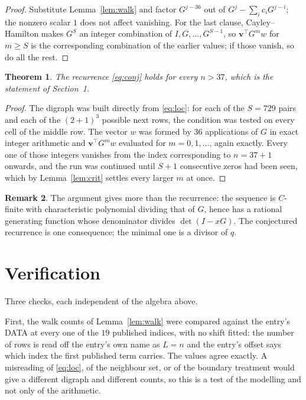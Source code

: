 \documentclass[11pt,a4paper]{article}
\theoremstyle{plain}
\newtheorem{theorem}{Theorem}
\theoremstyle{definition}
\newtheorem{remark}[theorem]{Remark}
\begin{document}
\begin{proof}
Substitute Lemma~\ref{lem:walk} and factor $G^{j-36}$ out of
$G^{j}-\sum_ic_iG^{j-i}$; the nonzero scalar $1$ does not affect
vanishing. For the last clause, Cayley--Hamilton makes $G^{S}$ an integer combination of
$I,G,\dots,G^{S-1}$, so $\mathbf{v}^{\!\top}G^{m}w$ for $m\ge S$ is the corresponding
combination of the earlier values; if those vanish, so do all the rest.
\end{proof}

\begin{theorem}
The recurrence \eqref{eq:conj} holds for every $n>37$, which is the statement of
Section~1.
\end{theorem}

\begin{proof}
The digraph was built directly from \eqref{eq:loc}: for each of the $S=729$ pairs and each
of the $(2+1)^{3}$ possible next rows, the condition was tested on every cell of
the middle row. The vector $w$ was formed by $36$ applications of $G$ in exact integer
arithmetic and $\mathbf{v}^{\!\top}G^{m}w$ evaluated for $m=0,1,\dots$, again exactly.
Every one of those integers vanishes from the index corresponding to $n=37+1$ onwards,
and the run was continued until $S+1$ consecutive zeros had been seen, which by
Lemma~\ref{lem:crit} settles every larger $m$ at once.
\end{proof}

\begin{remark}
The argument gives more than the recurrence: the sequence is $C$-finite with characteristic
polynomial dividing that of $G$, hence has a rational generating function whose denominator
divides $\det(I-xG)$. The conjectured recurrence is one consequence; the minimal one is a
divisor of $q$.
\end{remark}

\section{Verification}

Three checks, each independent of the algebra above.

First, the walk counts of Lemma~\ref{lem:walk} were compared against the entry's DATA at
every one of the $19$ published indices, with no shift fitted: the number of rows is
read off the entry's own name as $L=n$ and the entry's offset says which index the first
published term carries. The values agree exactly. A misreading of \eqref{eq:loc}, of the
neighbour set, or of the boundary treatment would give a different digraph and different
counts, so this is a test of the modelling and not only of the arithmetic.
\end{document}
